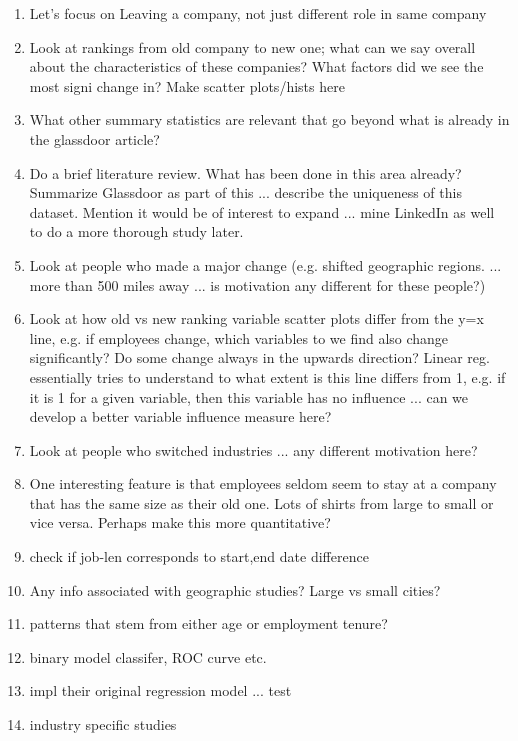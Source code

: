 \documentclass{amsart}[12pt]
\begin{document}
\begin{enumerate}
    \item Let's focus on Leaving a company, not just different role in same company 
    \item Look at rankings from old company to new one; what can we say overall about 
         the characteristics of these companies?  What factors did we see the most signi
         change in? Make scatter plots/hists here 
    \item What other summary statistics are relevant that go beyond what is already in 
          the glassdoor article? 
    \item Do a brief literature review.  What has been done in this area already?
          Summarize Glassdoor as part of this ... describe the uniqueness of this dataset. 
          Mention it would be of interest to expand ... mine LinkedIn as well to do a 
          more thorough study later. 
    \item Look at people who made a major change (e.g. shifted geographic regions. ... more than 500 miles 
          away ... is motivation any different for these people?)
    \item Look at how old vs new ranking variable scatter plots differ from the y=x line, 
        e.g. if employees change, which variables to we find also change significantly?  
          Do some change always in the upwards direction? Linear reg. essentially tries 
          to understand to what extent is this line differs from 1, e.g. if it is 1 for 
          a given variable, then this variable has no influence ... can we develop a 
          better variable influence measure here? 
    \item Look at people who switched industries ... any different motivation here? 
    \item One interesting feature is that employees seldom seem to stay at a company that has the 
          same size as their old one.  Lots of shirts from large to small or vice versa.  Perhaps 
          make this more quantitative? 
    \item  check if job-len corresponds to start,end date difference 
    \item Any info associated with geographic studies?  Large vs small cities? 
    \item  patterns that stem from either age or employment tenure? 
    \item binary model classifer, ROC curve etc. 
    \item impl their original regression model ... test 
    \item  industry specific studies 
\end{enumerate}
\end{document}
